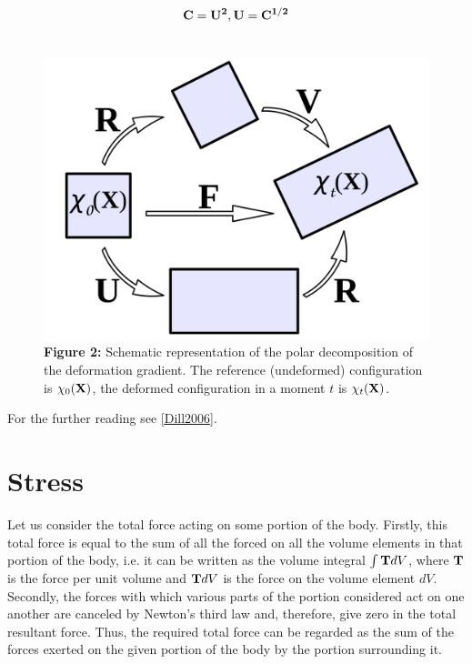 \documentclass[letterpaper,10pt,english]{sphinxmanual}
\begin{document}
\label{general:equation-eqstrain17}\begin{gather}
\begin{split}{\bf C} = {\bf U^2}, {\bf U} = {\bf C^{1/2}}\end{split}\label{general-eqstrain17}\\\begin{split}\end{split}\notag
\end{gather}\begin{figure}[htbp]
\centering
\capstart

\includegraphics{Fig2.png}
\caption{\textbf{Figure 2:} Schematic representation of the polar decomposition of the deformation gradient. The reference (undeformed) configuration is $\chi_{0}({\bf X})$, the deformed configuration in a moment $t$ is $\chi_{t}({\bf X})$.}\end{figure}

For the further reading see {\hyperref[general:dill2006]{{[}Dill2006{]}}}.


\section{Stress}
\label{general:theorstress}\label{general:stress}
Let us consider the total force acting on some portion of the body. Firstly, this total force is equal to the sum of all the forced on all the volume elements in that portion of the body, i.e. it can be written as the volume integral $\int {\bf T}dV$, where ${\bf T}$ is the force per unit volume and ${\bf T}dV$ is the force on the volume element $dV$. Secondly, the forces with which various parts of the portion considered act on one another are canceled by Newton's third law and, therefore, give zero in the total resultant force. Thus, the required total force can be regarded as the sum of the forces exerted on the given portion of the body by the portion surrounding it.
\end{document}

